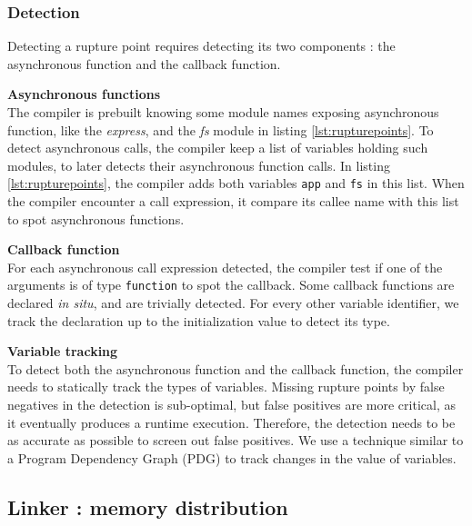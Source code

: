 \subsubsection{Detection}

Detecting a rupture point requires detecting its two components : the asynchronous function and the callback function.

\textbf{Asynchronous functions}\\
The compiler is prebuilt knowing some module names exposing asynchronous function, like the \textit{express}, and the \textit{fs} module in listing \ref{lst:rupturepoints}.
To detect asynchronous calls, the compiler keep a list of variables holding such modules, to later detects their asynchronous function calls.
In listing \ref{lst:rupturepoints}, the compiler adds both variables \texttt{app} and \texttt{fs} in this list.
When the compiler encounter a call expression, it compare its callee name with this list to spot asynchronous functions.

\textbf{Callback function}\\
For each asynchronous call expression detected, the compiler test if one of the arguments is of type \texttt{function} to spot the callback.
Some callback functions are declared \textit{in situ}, and are trivially detected.
For every other variable identifier, we track the declaration up to the initialization value to detect its type.

\textbf{Variable tracking}\\
To detect both the asynchronous function and the callback function, the compiler needs to statically track the types of variables.
Missing rupture points by false negatives in the detection is sub-optimal, but false positives are more critical, as it eventually produces a runtime execution.
Therefore, the detection needs to be as accurate as possible to screen out false positives.
We use a technique similar to a Program Dependency Graph (PDG)\cite{Ferrante1987} to track changes in the value of variables.


\subsection{Linker : memory distribution} \label{section:linker}

